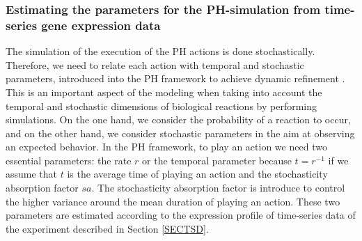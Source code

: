 





\subsubsection{Estimating the parameters for the PH-simulation from time-series gene expression data}


The simulation of the execution of the PH actions is done stochastically.  Therefore, we need to relate each action with temporal 
and stochastic parameters, introduced into the PH framework to achieve dynamic refinement \cite{PMR10-TCSB}. 
This is an important aspect of the modeling when taking into account the temporal and stochastic dimensions of 
biological reactions by performing simulations. 
On the one hand, we consider the probability of a reaction to occur, and on the other hand, we 
consider stochastic parameters in the aim at observing an expected behavior. 
In the PH framework, to play an action we need two essential parameters: the rate $r$ or the temporal parameter because $t=r^{-1}$ if we assume that $t$ is the average time of playing an action
and the stochasticity absorption factor $sa$. The stochasticity absorption factor is introduce to control the higher variance 
around the mean duration of playing an action. These two parameters are estimated according to the expression profile of time-series data of the experiment
described in Section \ref{SECTSD}. 





